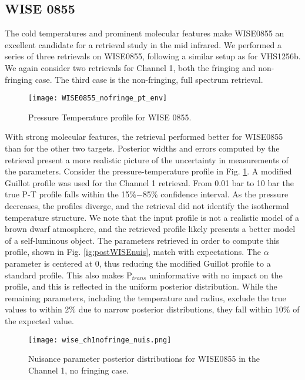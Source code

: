 \subsection{WISE 0855}
The cold temperatures and prominent molecular features make WISE0855 an excellent candidate for a retrieval study in the mid infrared.
We performed a series of three retrievals on WISE0855, following a similar setup as for VHS1256b.
We again consider two retrievals for Channel 1, both the fringing and non-fringing case.
The third case is the non-fringing, full spectrum retrieval.

\begin{figure}[t]
	\texttt{[image: WISE0855\_nofringe\_pt\_env]}
	\caption{Pressure Temperature profile for WISE 0855.}
	\label{fig:presWISE}
\end{figure}
With strong molecular features, the retrieval performed better for WISE0855 than for the other two targets.
Posterior widths and errors computed by the retrieval present a more realistic picture of the uncertainty in measurements of the parameters.
Consider the pressure-temperature profile in Fig. \ref{fig:presWISE}.
A modified Guillot profile was used for the Channel 1 retrieval.
From 0.01 bar to 10 bar the true P-T profile falls within the 15\%$-$85\% confidence interval.
As the pressure decreases, the profiles diverge, and the retrieval did not identify the isothermal temperature structure.
We note that the input profile is not a realistic model of a brown dwarf atmosphere, and the retrieved profile likely presents a better model of a self-luminous object.
The parameters retrieved in order to compute this profile, shown in Fig. \ref{ig:postWISEnuis}, match with expectations.
The $\alpha$ parameter is centered at 0, thus reducing the modified Guillot profile to a standard profile.
This also makes P$_{trans}$ uninformative with no impact on the profile, and this is reflected in the uniform posterior distribution.
While the remaining parameters, including the temperature and radius, exclude the true values to within 2\% due to narrow posterior distributions, they fall within 10\% of the expected value.

\begin{figure}[h]
	\texttt{[image: wise\_ch1nofringe\_nuis.png]}
	\caption{Nuisance parameter posterior distributions for WISE0855 in the Channel 1, no fringing case.}
	\label{fig:postWISEnuis}
\end{figure}

